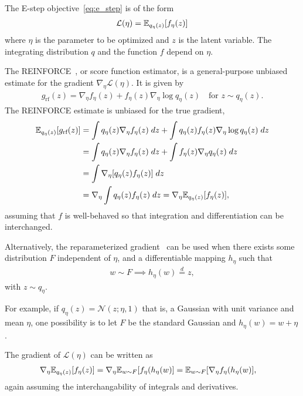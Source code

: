 The E-step objective~\eqref{eq:e_step} is of the form 
\begin{align}
    \mathcal{L}(\eta) = \mathbb{E}_{q_\eta(z)}[f_\eta(z)]
\end{align}
where $\eta$ is the parameter to be optimized and $z$ is the latent variable. The integrating distribution $q$ and the function $f$ depend on $\eta$. 

The REINFORCE~\cite{Williams1992reinforce}, or score function estimator, is a general-purpose unbiased estimate for the gradient $\nabla_\eta \mathcal{L}(\eta)$. It is given by 
\begin{align}
    g_{\textrm{rf}}(z) = \nabla_\eta f_\eta(z) + 
            f_\eta(z)  \nabla_\eta \log q_\eta(z)
    \quad \text{for } 
    z\sim q_\eta(z). 
\end{align}
The REINFORCE estimate is unbiased for the true gradient, \begin{align}
    \mathbb{E}_{q_\eta(z)}[g_{\textrm{rf}}(z)] &= 
    \int q_\eta(z) \nabla_\eta f_\eta(z) \; dz+ 
    \int q_\eta(z) f_\eta(z)  \nabla_\eta \log q_\eta(z)\; dz \\
    &= \int q_\eta(z) \nabla_\eta f_\eta(z) \; dz+ 
    \int f_\eta(z) \nabla_\eta q_\eta(z)  \; dz \\
    &= \int \nabla_\eta[q_\eta(z) f_\eta(z)] \; dz \\
    &= \nabla_\eta \int q_\eta(z) f_\eta(z) \; dz 
    = \nabla_\eta \mathbb{E}_{q_\eta(z)}[f_\eta(z)],
\end{align}
assuming that $f$ is well-behaved so that integration and differentiation can be interchanged. 

Alternatively, the reparameterized gradient~\cite{rezende2014stochastic, kingma2013autoencoding} can be used when there exists some distribution $F$ independent of $\eta$, and a differentiable mapping $h_\eta$ such that 
\begin{align}
    w \sim F \implies h_\eta(w) \stackrel{d}{=} z,
\end{align}
with $z\sim q_\eta$. 

For example, if $q_{\eta}(z) = \mathcal{N}(z; \eta, 1)$ that is, a Gaussian with unit variance and mean $\eta$, one possibility is to let $F$ be the standard Gaussian and $h_\eta(w) = w + \eta$. 

The gradient of $\mathcal{L}(\eta)$ can be written as 
\begin{align}
    \nabla_\eta \mathbb{E}_{q_\eta(z)}[f_\eta(z)] &= 
        \nabla_\eta \mathbb{E}_{w\sim F}[f_\eta(h_\eta(w)] = \mathbb{E}_{w\sim F}[\nabla_\eta f_\eta(h_\eta(w)], 
\end{align}
again assuming the interchangability of integrals and derivatives. 

